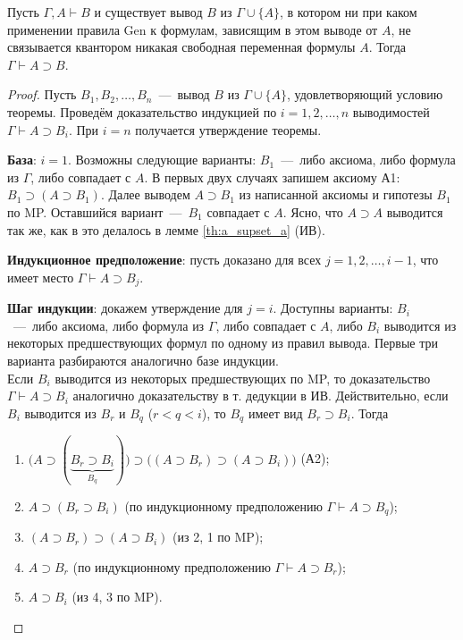\begin{theorem}
    Пусть $\Gamma, A \vdash B$ и существует вывод $B$ из $\Gamma \cup \{A\}$, в котором ни при каком применении правила Gen к формулам, зависящим в этом выводе от $A$, не связывается квантором никакая свободная переменная формулы $A$. Тогда $\Gamma \vdash A \supset B$.
\end{theorem}
\begin{proof}
    Пусть $B_1, B_2, \dots, B_n$~---~вывод $B$ из $\Gamma \cup \{A\}$, удовлетворяющий условию теоремы. Проведём доказательство индукцией по $i = 1, 2, \dots, n$ выводимостей $\Gamma \vdash A \supset B_i$. При $i = n$ получается утверждение теоремы.

    \textbf{База}: $i = 1$. Возможны следующие варианты: $B_1$~---~либо аксиома, либо формула из $\Gamma$, либо совпадает с $A$. В первых двух случаях запишем аксиому А1: $B_1 \supset (A \supset B_1)$. Далее выводем $A \supset B_1$ из написанной аксиомы и гипотезы $B_1$ по MP. Оставшийся вариант~---~$B_1$ совпадает с $A$. Ясно, что $A \supset A$ выводится так же, как в это делалось в лемме \ref{th:a_supset_a} (ИВ).

    \textbf{Индукционное предположение}: пусть доказано для всех $j = 1, 2, \dots, i - 1$, что имеет место $\Gamma \vdash A \supset B_j$.

    \textbf{Шаг индукции}: докажем утверждение для $j = i$. Доступны варианты: $B_i$~---~либо аксиома, либо формула из $\Gamma$, либо совпадает с $A$, либо $B_i$ выводится из некоторых предшествующих формул по одному из правил вывода. Первые три варианта разбираются аналогично базе индукции. \\
    Если $B_i$ выводится из некоторых предшествующих по MP, то доказательство $\Gamma \vdash A \supset B_i$ аналогично доказательству в т. дедукции в ИВ. Действительно, если $B_i$ выводится из $B_r$ и $B_q$ ($r < q < i$), то $B_q$ имеет вид $B_r \supset B_i$. Тогда 
    \begin{enumerate}
        \item $\big(A \supset (\underbrace{B_r \supset B_i}_{B_q})\big) \supset \big((A \supset B_r) \supset (A \supset B_i)\big)$ (А2);
        \item $A \supset (B_r \supset B_i)$ (по индукционному предположению $\Gamma \vdash A \supset B_q$);
        \item $(A \supset B_r) \supset (A \supset B_i)$ (из 2, 1 по MP);
        \item $A \supset B_r$ (по индукционному предположению $\Gamma \vdash A \supset B_r$);
        \item $A \supset B_i$ (из 4, 3 по MP).
    \end{enumerate}


\end{proof}
